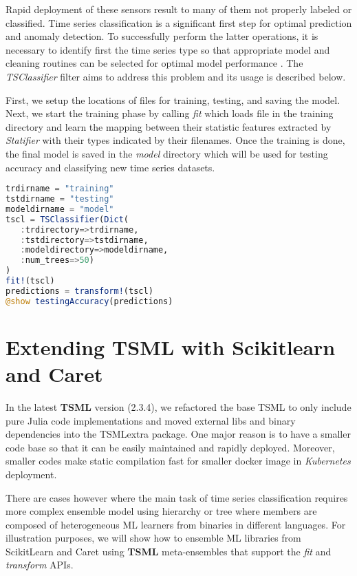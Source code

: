 \documentclass{juliacon}
\begin{document}
Rapid deployment of these sensors result to many of them not properly labeled or classified.
Time series classification is a significant first step for optimal prediction and anomaly detection.
To successfully perform the latter operations, it is necessary to identify first the time series
type so that appropriate model and cleaning routines can be selected for optimal model performance . 
The  \emph{TSClassifier} filter aims to address this problem and its usage is described below.

\vskip 6pt
First, we setup the locations of files for training, testing, and saving the model.
Next, we start the training phase by calling \emph{fit} which loads
file in the training directory and learn the mapping between their
statistic features extracted by \emph{Statifier} with their types indicated
by their filenames. Once the training is done, the final model
is saved in the \emph{model} directory which will be used for 
testing accuracy and classifying new time series datasets. 

\begin{lstlisting}[language = Julia]
trdirname = "training"
tstdirname = "testing"
modeldirname = "model"
tscl = TSClassifier(Dict(
   :trdirectory=>trdirname,
   :tstdirectory=>tstdirname,
   :modeldirectory=>modeldirname,
   :num_trees=>50)
)
fit!(tscl)
predictions = transform!(tscl)
@show testingAccuracy(predictions)
\end{lstlisting}

\section{Extending TSML with Scikitlearn and Caret}
In the latest \textbf{TSML} version (2.3.4), we refactored the base TSML
to only include pure Julia code implementations and moved
external libs and binary dependencies into the TSMLextra package. 
One major reason is to have a smaller code base so that it can be easily
maintained and rapidly deployed. Moreover, smaller codes make
static compilation fast for smaller docker image  
in \emph{Kubernetes} deployment. 

There are cases however where the main task of time series classification 
requires more complex ensemble model using hierarchy or tree where 
members are composed of heterogeneous ML learners from binaries in 
different languages. For illustration purposes, we will show how to 
ensemble ML libraries from ScikitLearn and Caret using \textbf{TSML} 
meta-ensembles that support the \emph{fit} and \emph{transform} APIs.
\end{document}
